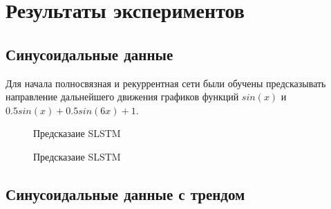 \documentclass[a4paper,fontsize=12pt,titlepage,final]{scrartcl}
\begin{document}
\newpage

\section{Результаты экспериментов}

\subsection{Синусоидальные данные}

Для начала полносвязная и рекуррентная сети были обучены предсказывать направление дальнейшего движения графиков функций $sin(x)$ и $0.5sin(x) + 0.5sin(6x) + 1$.

\begin{figure}[!h]
\caption{Предсказаие SLSTM}\label{ris:sinx}
\end{figure}

\begin{figure}[!h]
\caption{Предсказаие SLSTM}\label{ris:sin3x}
\end{figure}

\subsection{Синусоидальные данные с трендом}
\end{document}

